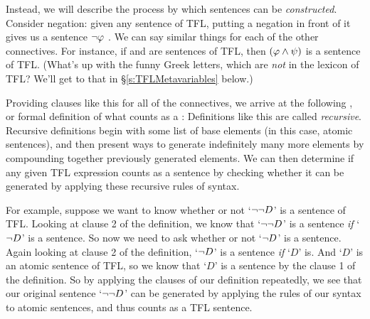 Instead, we will describe the process by which sentences can be \emph{constructed}. Consider negation: given any sentence \meta{\varphi} of TFL, putting a negation in front of it gives us a sentence $\neg\mathcal{\varphi}$ .
We can say similar things for each of the other connectives. For instance, if \meta{\varphi} and \meta{\psi} are sentences of TFL, then $(\mathcal{\varphi}\wedge\mathcal{\psi})$ is a sentence of TFL.  (What's up with the funny Greek letters, which are \emph{not} in the lexicon of TFL?  We'll get to that in \S\ref{s:TFLMetavariables} below.)


Providing clauses like this for all of the connectives, we arrive at the following , or formal definition of what counts as a  :
Definitions like this are called \emph{recursive}. Recursive definitions begin with some list of base elements (in this case, atomic sentences), and then present ways to generate indefinitely many more elements by compounding together previously generated elements.  We can then determine if any given TFL expression counts as a sentence by checking whether it can be generated by applying these recursive rules of syntax.



For example, suppose we want to know whether or not `$\neg \neg D$' is a sentence of TFL. Looking at clause 2 of the definition, we know that `$\neg \neg D$' is a sentence \emph{if} `$\neg D$' is a sentence. So now we need to ask whether or not `$\neg D$' is a sentence. Again looking at  clause 2 of the definition, `$\neg D$' is a sentence \emph{if} `$D$' is. And `$D$' is an atomic sentence of TFL, so we know that `$D$' is a sentence by the clause 1 of the definition. So by applying the clauses of our definition repeatedly, we see that our original sentence `$\neg \neg D$' can be generated by applying the rules of our syntax to atomic sentences, and thus counts as a TFL sentence.


